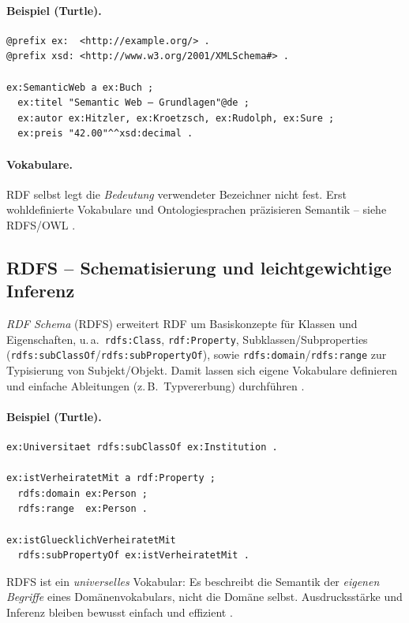 \paragraph{Beispiel (Turtle).}
\begin{lstlisting}
@prefix ex:  <http://example.org/> .
@prefix xsd: <http://www.w3.org/2001/XMLSchema#> .

ex:SemanticWeb a ex:Buch ;
  ex:titel "Semantic Web – Grundlagen"@de ;
  ex:autor ex:Hitzler, ex:Kroetzsch, ex:Rudolph, ex:Sure ;
  ex:preis "42.00"^^xsd:decimal .
\end{lstlisting}

\paragraph{Vokabulare.} RDF selbst legt die \emph{Bedeutung} verwendeter Bezeichner nicht fest. Erst wohldefinierte Vokabulare und Ontologiesprachen präzisieren Semantik -- siehe RDFS/OWL \cite{Hitzler,AntoniouVanHarmelen}.

\subsection{RDFS -- Schematisierung und leichtgewichtige Inferenz}

\emph{RDF Schema} (RDFS) erweitert RDF um Basiskonzepte für Klassen und Eigenschaften, u.\,a.\ \texttt{rdfs:Class}, \texttt{rdf:Property}, Subklassen/Subproperties (\texttt{rdfs:subClassOf}/\texttt{rdfs:subPropertyOf}), sowie \texttt{rdfs:domain}/\texttt{rdfs:range} zur Typisierung von Subjekt/Objekt. Damit lassen sich eigene Vokabulare definieren und einfache Ableitungen (z.\,B.\ Typvererbung) durchführen \cite{RDFS11,Hitzler}.

\paragraph{Beispiel (Turtle).}
\begin{lstlisting}
ex:Universitaet rdfs:subClassOf ex:Institution .

ex:istVerheiratetMit a rdf:Property ;
  rdfs:domain ex:Person ;
  rdfs:range  ex:Person .

ex:istGluecklichVerheiratetMit
  rdfs:subPropertyOf ex:istVerheiratetMit .
\end{lstlisting}

RDFS ist ein \emph{universelles} Vokabular: Es beschreibt die Semantik der \emph{eigenen Begriffe} eines Domänenvokabulars, nicht die Domäne selbst. Ausdrucksstärke und Inferenz bleiben bewusst einfach und effizient \cite{RDFS11}.

